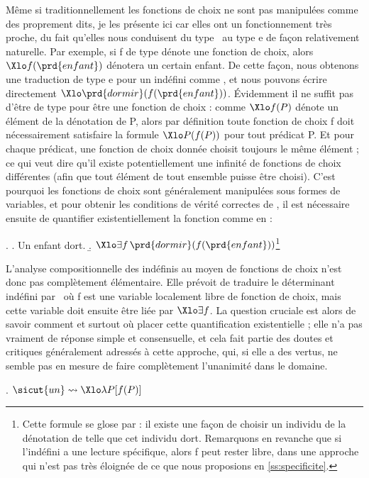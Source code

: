 Même si traditionnellement les fonctions de choix ne sont pas manipulées comme des  proprement dits, je les présente ici car elles ont un  fonctionnement très proche, du fait qu'elles nous conduisent du type \et\ au type \typ e de façon relativement naturelle.
Par exemple, si \vrb f de type  dénote une fonction de choix, alors $\Xlo f(\prd{enfant})$ dénotera un certain enfant.  
De cette façon, nous obtenons une traduction de type \typ e pour un indéfini comme , et nous pouvons écrire directement $\Xlo\prd{dormir}(f(\prd{enfant}))$.  Évidemment il ne suffit pas d'être de type  pour être une fonction de choix :  comme $\Xlo f(P)$ dénote un élément de la dénotation de \vrb P, alors par définition toute fonction de choix \vrb f doit nécessairement satisfaire la formule $\Xlo P(f(P))$ pour tout prédicat \vrb P.
Et pour chaque prédicat, une fonction de choix donnée choisit toujours le même élément ; ce qui veut dire qu'il existe potentiellement une infinité de fonctions de choix différentes (afin que tout élément de tout ensemble puisse être choisi).  
C'est pourquoi les fonctions de choix sont généralement manipulées sous formes de variables, et  pour obtenir les conditions de vérité correctes de \Next[a], il est nécessaire ensuite de quantifier existentiellement la fonction comme en \Next[b] :

\ex.
\a. Un enfant dort.
\b. $\Xlo\exists f\,\prd{dormir}(f(\prd{enfant}))$\footnote{Cette formule se glose par : il existe une façon de choisir un individu de la dénotation de  telle que cet individu dort. Remarquons en revanche que si l'indéfini a une lecture spécifique, alors \vrb f peut rester libre, dans une approche qui n'est pas très éloignée de ce que nous proposions en \ref{ss:specificite}.}


L'analyse compositionnelle des indéfinis au moyen de fonctions de choix n'est donc pas complètement élémentaire. Elle prévoit de traduire le déterminant indéfini par \Next\ où \vrb f est une variable localement libre de fonction de choix, mais cette variable doit ensuite être liée par $\Xlo\exists f$.  La question cruciale est alors de savoir comment et surtout où placer cette quantification existentielle ; elle n'a pas vraiment de réponse simple et consensuelle, et cela fait partie des doutes et critiques généralement adressés à cette approche, qui, si elle a des vertus, ne semble pas en mesure de faire complètement l'unanimité dans le domaine. 

\ex.
\(\sicut{un} \leadsto \Xlo\lambda P [f(P)]\)

